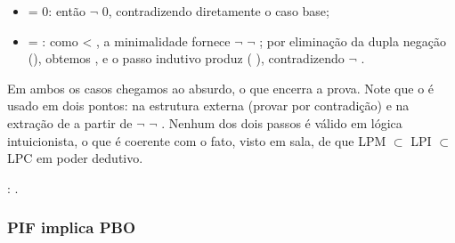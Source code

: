 \begin{itemize}
\item  {} = 0: então \ensuremath{\lnot}  0, contradizendo diretamente o caso base;



\item  {} =  : como  <  , a minimalidade fornece \ensuremath{\lnot} \ensuremath{\lnot}  ;
      por eliminação da dupla negação (), obtemos  , e o
      passo indutivo produz  ( ), contradizendo \ensuremath{\lnot}  .

\end{itemize}


    Em ambos os casos chegamos ao absurdo, o que encerra a prova.
    Note que o  é usado em dois pontos: na estrutura externa
    (provar   por contradição) e na extração de   a partir
    de \ensuremath{\lnot} \ensuremath{\lnot}  . Nenhum dos dois passos é válido em lógica
    intuicionista, o que é coerente com o fato, visto em sala, de
    que LPM $\subset$ LPI $\subset$ LPC em poder dedutivo. 
\begin{coqdoccode}
\coqdocemptyline
\coqdocnoindent
{} :   .\coqdoceol
\coqdocemptyline
\end{coqdoccode}
\subsubsection{PIF implica PBO}





